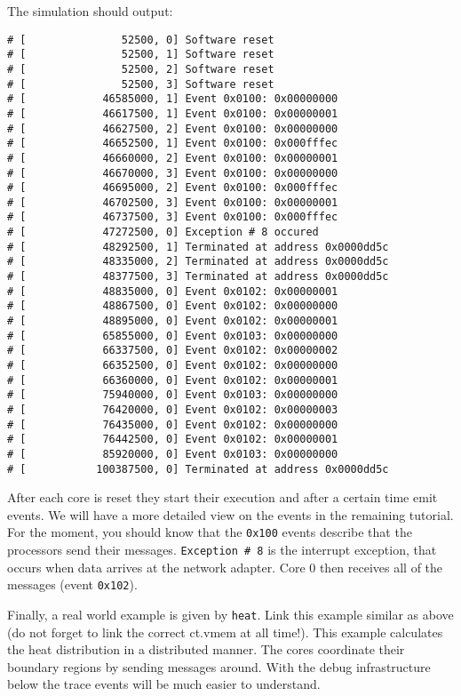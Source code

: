 The simulation should output:

\begin{lstlisting}
# [               52500, 0] Software reset
# [               52500, 1] Software reset
# [               52500, 2] Software reset
# [               52500, 3] Software reset
# [            46585000, 1] Event 0x0100: 0x00000000
# [            46617500, 1] Event 0x0100: 0x00000001
# [            46627500, 2] Event 0x0100: 0x00000000
# [            46652500, 1] Event 0x0100: 0x000fffec
# [            46660000, 2] Event 0x0100: 0x00000001
# [            46670000, 3] Event 0x0100: 0x00000000
# [            46695000, 2] Event 0x0100: 0x000fffec
# [            46702500, 3] Event 0x0100: 0x00000001
# [            46737500, 3] Event 0x0100: 0x000fffec
# [            47272500, 0] Exception # 8 occured
# [            48292500, 1] Terminated at address 0x0000dd5c
# [            48335000, 2] Terminated at address 0x0000dd5c
# [            48377500, 3] Terminated at address 0x0000dd5c
# [            48835000, 0] Event 0x0102: 0x00000001
# [            48867500, 0] Event 0x0102: 0x00000000
# [            48895000, 0] Event 0x0102: 0x00000001
# [            65855000, 0] Event 0x0103: 0x00000000
# [            66337500, 0] Event 0x0102: 0x00000002
# [            66352500, 0] Event 0x0102: 0x00000000
# [            66360000, 0] Event 0x0102: 0x00000001
# [            75940000, 0] Event 0x0103: 0x00000000
# [            76420000, 0] Event 0x0102: 0x00000003
# [            76435000, 0] Event 0x0102: 0x00000000
# [            76442500, 0] Event 0x0102: 0x00000001
# [            85920000, 0] Event 0x0103: 0x00000000
# [           100387500, 0] Terminated at address 0x0000dd5c
\end{lstlisting}

After each core is reset they start their execution and after a
certain time emit events. We will have a more detailed view on the
events in the remaining tutorial. For the moment, you should know that
the \verb|0x100| events describe that the processors send their
messages. \verb|Exception # 8| is the interrupt exception, that occurs
when data arrives at the network adapter. Core 0 then receives all of
the messages (event \verb|0x102|).

Finally, a real world example is given by \verb|heat|. Link this
example similar as above (do not forget to link the correct ct.vmem at
all time!). This example calculates the heat distribution in a
distributed manner. The cores coordinate their boundary regions by
sending messages around. With the debug infrastructure below the trace
events will be much easier to understand.

